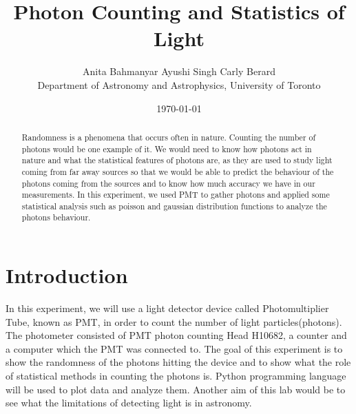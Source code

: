 \documentclass[letterpaper,12pt]{article}
\begin{document}
\onehalfspacing
\title{Photon Counting and Statistics of Light}
\author{Anita Bahmanyar \qquad Ayushi Singh \qquad Carly Berard \\Department of Astronomy and Astrophysics, University of Toronto}
\date{\today}

\maketitle
\begin{abstract}
\label{abstract}
Randomness is a phenomena that occurs often in nature. Counting the number of photons would be one example of it. We would need to know how photons act in nature and what the statistical features of photons are, as they are used to study light coming from far away sources so that we would be able to predict the behaviour of the photons coming from the sources and to know how much accuracy we have in our measurements. In this experiment, we used PMT to gather photons and applied some statistical analysis such as poisson and gaussian distribution functions to analyze the photons behaviour.
\end{abstract}

\section{Introduction}
\label{sec:introduction}
In this experiment, we will use a light detector device called Photomultiplier Tube, known as PMT, in order to count the number of light particles(photons). The photometer consisted of PMT photon counting Head H10682, a counter and a computer which the PMT was connected to. The goal of this experiment is to show the randomness of the photons hitting the device and to show what the role of statistical methods in counting the photons is. Python programming language will be used to plot data and analyze them. Another aim of this lab would be to see what the limitations of detecting light is in astronomy.

\end{document}
